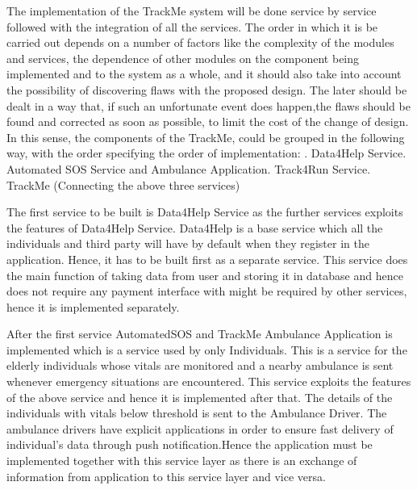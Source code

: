 The implementation of the TrackMe system will be done service by service followed with the integration of all the services. The order in which it is be carried out depends on a number of factors like the complexity of the modules and services, the dependence of other modules on the component being implemented and to the system as a whole, and it should also take into account the possibility of discovering flaws with the proposed design. The later should be dealt in a way that, if such an unfortunate event does happen,the flaws should be found and corrected as soon as possible, to limit the cost of the change of design. 
In this sense, the components of the TrackMe, could be grouped in the following way, with the order specifying the order of implementation: . Data4Help Service. Automated SOS Service and Ambulance Application. Track4Run Service. TrackMe (Connecting the above three services)\newline

The first service to be built is Data4Help Service as the further services exploits the features of Data4Help Service. Data4Help is a base service which all the individuals and third party will have by default when they register in the application. Hence, it has to be built first as a separate service. This service does the main function of taking data from user and storing it in database and hence does not require any payment interface with might be required by other services, hence it is implemented separately.\newline 

After the first service AutomatedSOS and TrackMe Ambulance Application is implemented which is a service used by only Individuals. This is a service for the elderly individuals whose vitals are monitored and a nearby ambulance is sent whenever emergency situations are encountered. This service exploits the features of the above service and hence it is implemented after that. The details of the individuals with vitals below threshold is sent to the Ambulance Driver. The ambulance drivers have explicit applications in order to ensure fast delivery of individual's data through push notification.Hence the application must be implemented together with this service layer as there is an exchange of information from application to this service layer and vice versa.\newline

